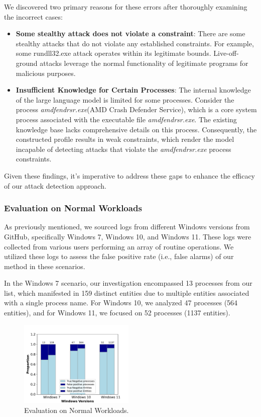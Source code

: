 We discovered two primary reasons for these errors after thoroughly examining the incorrect cases:
\begin{itemize}
    \item \textbf{Some stealthy attack does not violate a constraint}: There are some stealthy attacks that do not violate any established constraints. For example, some rundll32.exe attack operates within its legitimate bounds. Live-off-ground attacks leverage the normal functionality of legitimate programs for malicious purposes.

    \item \textbf{Insufficient Knowledge for Certain Processes}:  The internal knowledge of the large language model is limited for some processes. Consider the process \textit{amdfendrsr.exe}(AMD Crash Defender Service), which is a core system process associated with the executable file \textit{amdfendrsr.exe}. The existing knowledge base lacks comprehensive details on this process. Consequently, the constructed profile results in weak constraints, which render the model incapable of detecting attacks that violate the \textit{amdfendrsr.exe} process constraints.
\end{itemize}
Given these findings, it's imperative to address these gaps to enhance the efficacy of our attack detection approach.


\subsubsection{Evaluation on Normal Workloads}
As previously mentioned, we sourced logs from different Windows versions from GitHub\cite{evtx-baseline2022}, specifically Windows 7, Windows 10, and Windows 11. These logs were collected from various users performing an array of routine operations. We utilized these logs to assess the false positive rate (i.e., false alarms) of our method in these scenarios.

In the Windows 7 scenario, our investigation encompassed 13 processes from our list, which manifested in 159 distinct entities due to multiple entities associated with a single process name. For Windows 10, we analyzed 47 processes (564 entities), and for Windows 11, we focused on 52 processes (1137 entities).

\begin{figure}[h]
    \centering
      \includegraphics[width=0.49\textwidth]{figs/normal_chart.pdf}
    \caption{Evaluation on Normal Workloads.}
    \label{fig-eva-normal}
\end{figure}


